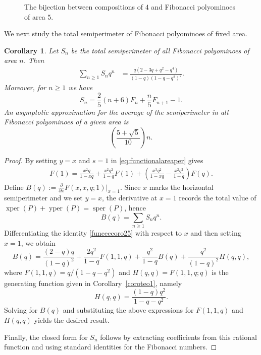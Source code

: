 \documentclass[12pt]{amsart}
\theoremstyle{plain}
\newtheorem{coro}[theorem]{Corollary}
\theoremstyle{definition}
\DeclareMathOperator{\yper}{yper}
\DeclareMathOperator{\xper}{xper}
\DeclareMathOperator{\sper}{sper}
\begin{document}
\begin{figure}[ht!]
\caption{The bijection between compositions of $4$ and Fibonacci polyominoes
of area $5$.}
\label{fig2b}
\end{figure}

We next study the total semiperimeter of Fibonacci polyominoes of fixed area.

\begin{coro}
Let $S_n$ be the total semiperimeter of all Fibonacci polyominoes of area $n$. Then 
\begin{align*}\sum_{n\geq 1} S_n q^n&=\frac{q (2 - 3 q + q^2 - q^4)}{(1 - q) (1 - q - q^2)^2}.\end{align*}
Moreover, for $n\geq 1$ we have
\[
S_n =  \frac{2}{5}(n+6)F_n + \frac{n}{5}F_{n+1}-1.
\]
An asymptotic approximation for the average of the semiperimeter in all Fibonacci polyominoes of a given area  is  
\[\left(\frac{5+\sqrt{5}}{10}\right)n.\]
\end{coro}
\begin{proof}
By setting $y=x$ and $s=1$ in \eqref{eq:functionalareaper} gives
\begin{align}\label{funceccoro25}
    F(1)
= \frac{x^2q}{1-xq}
+ \frac{x^2q^{2}}{1-q} F(1)
+ \left( \frac{x^3 q^{2}}{1-xq} - \frac{x^2q^2}{1-q} \right) F(q).
\end{align}
Define $B(q):=\frac{\partial}{\partial x}F(x,x,q;1)\rvert_{x=1}$.  Since $x$ marks the horizontal semiperimeter and we  set $y=x$, the derivative at $x=1$ records the total value of $\xper(P)+\yper(P)=\sper(P)$, hence
\[
B(q)=\sum_{n\geq 1} S_n q^n.
\]
Differentiating the identity \eqref{funceccoro25} with respect to $x$ and then setting $x=1$, we obtain
\[B(q)=\frac{(2 - q) q}{(1-q)^2} + \frac{2 q^2}{1-q}F(1,1,q) + \frac{q^2}{1-q}B(q) +\frac{q^2}{(1-q)^2} H(q,q),  \]
where $F(1,1,q)=q/(1-q-q^2)$ and  $H(q,q)=F(1,1,q;q)$ is the generating function given in Corollary~\ref{coroteo1}, namely
$$H(q,q)=\frac{(1 - q) q^2}{1 - q - q^2}.$$
Solving for $B(q)$ and substituting the above expressions for $F(1,1,q)$ and $H(q,q)$ yields the desired result. 

Finally, the closed form for $S_n$ follows by extracting coefficients from this rational function and using standard identities for the Fibonacci numbers.
\end{proof}
\end{document}
